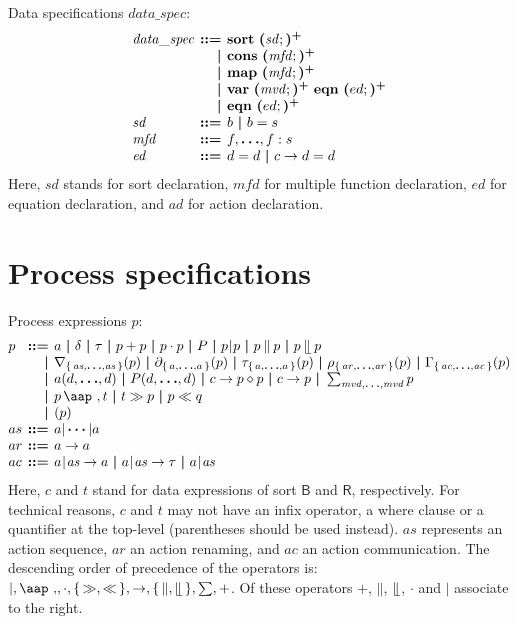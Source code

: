\documentclass[a4paper,fleqn,10pt]{article}
\makeatletter
\newcommand{\f}[1]{\ensuremath{\mathit{#1}}}
\newcommand{\sbool}{\ensuremath{\mathsf{B}}}
\newcommand{\sreal}{\ensuremath{\mathsf{R}}}
\newenvironment{tightarray}[1]
  {\setlength{\arraycolsep}{2pt}%
   \begin{array}{@{}#1@{}}%
  }
  {\end{array}%
  }
\newcommand{\set}[1]{\ensuremath{\{\,#1\,\}}}
\newcommand{\seq}{\mathbin{\cdot}}
\newcommand{\alt}{\mathbin{+}}
\newcommand{\pmerge}{\mathbin{\parallel}}
\newcommand{\lmerge}{\mathbin{\llfloor}}
\newcommand{\sync}{\mathbin{\!\mid\!}}
\newcommand{\block}[1]{\partial_{#1}}
\newcommand{\hide}[1]{\tau_{#1}}
\newcommand{\ren}[1]{\rho_{#1}}
\newcommand{\allow}[1]{\nabla_{#1}}
\newcommand{\comm}[1]{\Gamma_{#1}}
\newcommand{\at}[1]{\mbox{\aap ,} #1}
\newcommand{\pinit}{\gg}
\newcommand{\pbefore}{\ll}
\newcommand{\mb}[1]{\text{\boldmath$#1$}}
\newcommand{\kwsort}{{\bf sort}}
\newcommand{\kwcons}{{\bf cons}}
\newcommand{\kwmap}{{\bf map}}
\newcommand{\kwvar}{{\bf var}}
\newcommand{\kweqn}{{\bf eqn}}
\makeatother
\begin{document}
Data specifications $\f{data\_spec}$:
\[\begin{tightarray}{lrl}
\f{data\_spec}
& \mb{::=} & \kwsort\ \mb{(}\f{sd};\mb{)^{+}}\\
& \mb{|}   & \kwcons\ \mb{(}\f{mfd};\mb{)^{+}}\\
& \mb{|}   & \kwmap\  \mb{(}\f{mfd};\mb{)^{+}}\\
& \mb{|}   & \kwvar\  \mb{(}\f{mvd};\mb{)^{+}}\ \kweqn\ \mb{(}ed;\mb{)^{+}}\\
& \mb{|}   & \kweqn\  \mb{(}ed;\mb{)^{+}}\\
\f{sd}  & \mb{::=} & b\ \mb{|}\ b = s\\
\f{mfd} & \mb{::=} & f, \mb{\ldots}, f: s\\
\f{ed}  & \mb{::=} & d = d\ \mb{|}\ c \to d = d\\
\end{tightarray}\]
Here, $\f{sd}$ stands for sort declaration,
$\f{mfd}$ for multiple function declaration,
$\f{ed}$ for equation declaration,
and $\f{ad}$ for action declaration.

\section{Process specifications}

Process expressions $p$:
\[\begin{tightarray}{lrl}
p   & \mb{::=} & a\ \mb{|}\ \delta\ \mb{|}\ \tau\ \mb{|}\ p \alt p\ \mb{|}\ p \seq p\ \mb{|}\ P\ \mb{|}\
            p \sync p\ \mb{|}\ p \pmerge p\ \mb{|}\ p \lmerge p\\
    & \mb{|} & \allow{\set{\f{as},\mb{\ldots},\f{as}}}(p)\ \mb{|}\
            \block{\set{a,\mb{\ldots},a}}(p)\ \mb{|}\
            \hide{\set{a,\mb{\ldots},a}}(p)\ \mb{|}\
            \ren{\set{\f{ar},\mb{\ldots},\f{ar}}}(p)\ \mb{|}\
            \comm{\set{\f{ac},\mb{\ldots},\f{ac}}}(p)\\
    & \mb{|} & a(d, \mb{\ldots}, d)\ \mb{|}\
            P(d, \mb{\ldots}, d)\ \mb{|}\
            c \to p \diamond p\ \mb{|}\
            c \to p\ \mb{|}\
            \sum_{\f{mvd},\mb{\ldots},\f{mvd}}p\\
     & \mb{|} & p\,\at\,t\ \mb{|}\ t \pinit p\ \mb{|}\ p \pbefore q\\
     & \mb{|} & ( p )\\
as  & \mb{::=} & a |\,\mb{\cdots} | a\\
ar  & \mb{::=} & a \to a\\
ac  & \mb{::=} & a\sync\f{as} \to a\ \mb{|}\ a\sync\f{as} \to \tau\ \mb{|}\ a\sync\f{as}\\
\end{tightarray}\]
Here, $c$ and $t$ stand for data expressions of sort $\sbool$ and $\sreal$,
respectively.
For technical reasons, $c$ and $t$ may not have an infix operator, a
where clause or a quantifier at the top-level (parentheses should be
used instead).
$\f{as}$ represents an action sequence, $\f{ar}$ an action
renaming, and $\f{ac}$ an action communication. The descending order of
precedence of the operators is: $\mid, \at, \seq, \set{\pinit, \pbefore}, \to,
\set{\pmerge,\lmerge},\sum,\alt$. Of these operators $\alt$, $\pmerge$,
$\lmerge$, $\seq$ and $\mid$ associate to the right.
\end{document}

